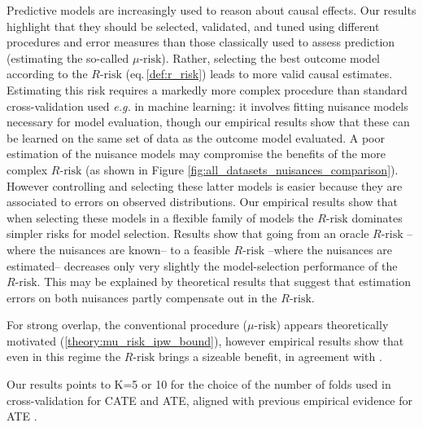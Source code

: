 \documentclass[10pt]{article}
\begin{document}
\begin{multicols}{2}
    Predictive models are increasingly used to reason about causal effects.
    Our results highlight that they should be selected, validated, and tuned
    using different procedures and error measures than those classically used
    to assess prediction (estimating the so-called $\mu\text{-risk}$).
    Rather, selecting the best outcome model according to the $R\text{-risk}$
    (eq.\,\autoref{def:r_risk}) leads to more valid causal estimates.
    Estimating this risk requires a markedly more complex procedure than
    standard cross-validation used \emph{e.g.} in machine learning: it involves
    fitting nuisance models necessary for model evaluation, though our
    empirical results show that these can be learned on the same set of data
    as the outcome model evaluated.
    A poor estimation of the nuisance models may compromise the benefits of
    the more complex $R\text{-risk}$ (as shown in Figure
    \ref{fig:all_datasets_nuisances_comparison}). However controlling and selecting
    these latter models is easier because they are associated to errors on
    observed distributions. Our empirical results show that when selecting
    these models in a flexible family of models the $R\text{-risk}$ dominates
    simpler risks for model selection.
    Results show that going from an oracle $R\text{-risk}$ --where the
    nuisances are known-- to a feasible $R\text{-risk}$ --where the nuisances
    are estimated-- decreases only very slightly the model-selection
    performance of the $R\text{-risk}$. This may be explained by
    theoretical results that suggest that estimation errors on both
    nuisances partly compensate out in the
    $R\text{-risk}$\cite{daniel2018double,naimi2021challenges,kennedy2020optimal,nie_quasioracle_2017,chernozhukov_double_2018}.

    For strong overlap, the conventional procedure ($\mu\text{-risk}$) appears theoretically motivated
    (\autoref{theory:mu_risk_ipw_bound}), however empirical results show that
    even in this regime the $R\text{-risk}$ brings a sizeable benefit,
    in agreement with \citet{schuler_comparison_2018}.

    Our results points to K=5 or 10 for the choice of the number of folds used in
    cross-validation for CATE and ATE, aligned with previous empirical evidence for
    ATE \cite{chernozhukov_double_2018}.



\end{multicols}
\end{document}

